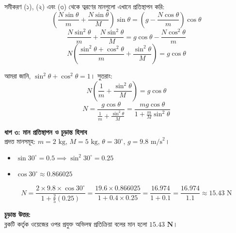 \documentclass[12pt, a4paper]{article}
\begin{document}
\begin{tcolorbox}[solutionbox={সমাধান (Solution)}]
সমীকরণ (১), (২) এবং (৩) থেকে ত্বরণের মানগুলো এখানে প্রতিস্থাপন করি: 
$$\left( \frac{N \sin\theta}{m} + \frac{N \sin\theta}{M} \right) \sin\theta = \left( g - \frac{N \cos\theta}{m} \right) \cos\theta$$ 
$$\frac{N \sin^2\theta}{m} + \frac{N \sin^2\theta}{M} = g \cos\theta - \frac{N \cos^2\theta}{m}$$ 
$$N \left( \frac{\sin^2\theta + \cos^2\theta}{m} + \frac{\sin^2\theta}{M} \right) = g \cos\theta$$

আমরা জানি, $\sin^2\theta + \cos^2\theta = 1$। সুতরাং: 
$$N \left( \frac{1}{m} + \frac{\sin^2\theta}{M} \right) = g \cos\theta$$ 
$$N = \frac{g \cos\theta}{\frac{1}{m} + \frac{\sin^2\theta}{M}} = \frac{m g \cos\theta}{1 + \frac{m}{M}\sin^2\theta}$$

\vspace{0.5em}
\noindent
\textbf{ধাপ ৩: মান প্রতিস্থাপন ও চূড়ান্ত হিসাব} \\
প্রদত্ত মানসমূহ: $m = 2\text{ kg}$, $M = 5\text{ kg}$, $\theta = 30^\circ$, $g = 9.8\text{ m/s}^2$।
\begin{itemize}[leftmargin=*, parsep=0.3ex]
    \item $\sin 30^\circ = 0.5 \implies \sin^2 30^\circ = 0.25$
    \item $\cos 30^\circ \approx 0.866025$
\end{itemize}

$$N = \frac{2 \times 9.8 \times \cos 30^\circ}{1 + \frac{2}{5} (0.25)} = \frac{19.6 \times 0.866025}{1 + 0.4 \times 0.25} = \frac{16.974}{1 + 0.1} = \frac{16.974}{1.1} \approx 15.43\text{ N}$$

\vspace{1em}
\begin{tcolorbox}[answerbox]
\textbf{চূড়ান্ত উত্তর:} \\
ব্লকটি কর্তৃক ওয়েজের ওপর প্রযুক্ত অভিলম্ব প্রতিক্রিয়া বলের মান হলো $\mathbf{15.43\text{ N}}$।
\end{tcolorbox}
\end{tcolorbox}
\end{document}
